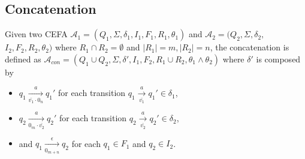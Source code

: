 \documentclass[sigconf]{acmart}
\newcommand*{\aut}{\mathcal{A}}
\begin{document}
\subsection{Concatenation}\label{subsec:con}
Given two CEFA $\aut_1 = (Q_1, \Sigma, \delta_1, I_1, F_1, R_1, \theta_1)$ and $\aut_2 = (Q_2, \Sigma, \delta_2,$ $I_2, F_2, R_2, \theta_2)$ where $R_1\cap R_2= \emptyset$ and $|R_1|=m,|R_2|=n$, the concatenation is defined as $\aut_{con}=(Q_1\cup Q_2, \Sigma, \delta', I_1, F_2, R_1\cup R_2, \theta_1\wedge\theta_2)$ where $\delta'$ is composed by
\begin{itemize}
  \item $q_1\xrightarrow[\bar{v_1}\cdot 0_n]{a} q_1'$ for each transition $q_1\xrightarrow[\bar{v_1}]{a} q_1' \in \delta_1$,
  \item $q_2\xrightarrow[0_m\cdot\bar{v_2}]{a} q_2'$ for each transition $q_2\xrightarrow[\bar{v_2}]{a} q_2' \in \delta_2$,
  \item and $q_1\xrightarrow[0_{m+n}]{\epsilon} q_2$ for each $q_1\in F_1$ and $q_2 \in I_2$.
\end{itemize}
\end{document}
